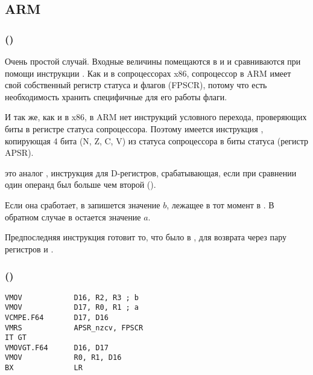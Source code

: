 \subsection{ARM}

\subsubsection{\OptimizingXcodeIV (\ARMMode)}



Очень простой случай.
Входные величины помещаются в  и  и сравниваются при помощи инструкции .
Как и в сопроцессорах x86, сопроцессор в ARM имеет свой собственный регистр статуса и флагов (\ac{FPSCR}),
потому что есть необходимость хранить специфичные для его работы флаги.

И так же, как и в x86, 
в ARM нет инструкций условного перехода, проверяющих биты в регистре статуса сопроцессора. 
Поэтому имеется инструкция , копирующая 4 бита (N, Z, C, V) 
из статуса сопроцессора в биты  статуса (регистр \ac{APSR}).

 это аналог , инструкция для D-регистров, срабатывающая, если при сравнении один операнд был больше чем второй
(). 

Если она сработает, 
в  запишется значение $b$, лежащее в тот момент в .
В обратном случае в  остается значение $a$.


Предпоследняя инструкция  готовит то, что было в , для возврата через 
пару регистров  и .

\subsubsection{\OptimizingXcodeIV (\ThumbTwoMode)}

\begin{lstlisting}[caption=\OptimizingXcodeIV (\ThumbTwoMode)]
VMOV            D16, R2, R3 ; b
VMOV            D17, R0, R1 ; a
VCMPE.F64       D17, D16
VMRS            APSR_nzcv, FPSCR
IT GT 
VMOVGT.F64      D16, D17
VMOV            R0, R1, D16
BX              LR
\end{lstlisting}

